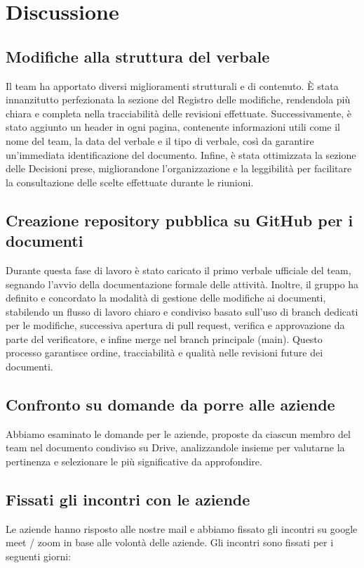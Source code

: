 \documentclass[a4paper,12pt]{article}
\begin{document}
\section{Discussione}{
    \subsection{Modifiche alla struttura del verbale}{
        Il team ha apportato diversi miglioramenti strutturali e di contenuto. È stata innanzitutto perfezionata la sezione del Registro delle modifiche, rendendola più chiara e completa nella tracciabilità delle revisioni effettuate. Successivamente, è stato aggiunto un header in ogni pagina, contenente informazioni utili come il nome del team, la data del verbale e il tipo di verbale, così da garantire un'immediata identificazione del documento. Infine, è stata ottimizzata la sezione delle Decisioni prese, migliorandone l'organizzazione e la leggibilità per facilitare la consultazione delle scelte effettuate durante le riunioni.
    }

    \subsection{Creazione repository pubblica su GitHub per i documenti}{
        Durante questa fase di lavoro è stato caricato il primo verbale ufficiale del team, segnando l'avvio della documentazione formale delle attività. Inoltre, il gruppo ha definito e concordato la modalità di gestione delle modifiche ai documenti, stabilendo un flusso di lavoro chiaro e condiviso basato sull'uso di branch dedicati per le modifiche, successiva apertura di pull request, verifica e approvazione da parte del verificatore, e infine merge nel branch principale (main). Questo processo garantisce ordine, tracciabilità e qualità nelle revisioni future dei documenti.
    }

    \subsection{Confronto su domande da porre alle aziende}{
        Abbiamo esaminato le domande per le aziende, proposte da ciascun membro del team nel documento condiviso su Drive, analizzandole insieme per valutarne la pertinenza e selezionare le più significative da approfondire.
    }

    \subsection{Fissati gli incontri con le aziende}{
        Le aziende hanno risposto alle nostre mail e abbiamo fissato gli incontri su google meet / zoom in base alle volontà delle aziende. Gli incontri sono fissati per i seguenti giorni: 

}}
\end{document}
